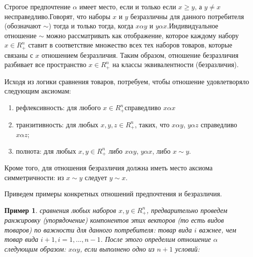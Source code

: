 \documentclass[12pt, 4paper]{book}
\newtheorem{example}{\indent \color{blue} Пример}[chapter]
\begin{document}
{\par
Строгое предпочтение $\alpha$ имеет место, если и только если $x\geq y$, а $y \neq x$ несправедливо.Говорят, что наборы $x$ и $y$ безразличны для данного потребителя (обозначают $\sim$) тогда и только тогда, когда $x \alpha y$ и $y \alpha x$.Индивидуальное отношение $\sim$ можно рассматривать как отображение, которое каждому набору $x\in R_{+}^{n}$ ставит в соответствие множество всех тех наборов товаров, которые связаны с $x$ отношением безразличия. Таким образом, отношение безразличия разбивает все пространство $x\in R_{+}^{n}$ на классы эквивалентности (безразличия).

Исходя из логики сравнения товаров, потребуем, чтобы отношение удовлетворяло следующим аксиомам:
\begin{enumerate}
\label{spisok1}
\item рефлексивность: для любого $x\in R_{+}^{n}$справедливо $x\alpha x$ 
\item транзитивность: для любых $x,y,z \in R_{+}^{n}$, таких, что $x \alpha y$, $y \alpha z$ справедливо
$x \alpha z$;
\item полнота: для любых $x,y \in R_{+}^{n}$ либо $x \alpha y$, $y \alpha x$, либо $x\sim y$. 
\end{enumerate}
\par
Кроме того, для отношения безразличия должна иметь место аксиома симметричности: из $x\sim y$ следует $y\sim x$.
\par
Приведем примеры конкретных отношений предпочтения и безразличия.

\begin{example}
\label{exam2.1}
 сравнения любых наборов $x,y \in R_{+}^{n}$, предварительно проведем ранжировку (упорядочение) компонентов этих векторов (то есть видов товаров) по важности для данного потребителя: товар вида $i$ важнее, чем товар вида $i+1, i=1,...,n-1$. После этого определим отношение $\alpha $ следующим образом: $x \alpha y$, если выполнено одно из $n+1$ условий:
\end{example}

}
\end{document}
